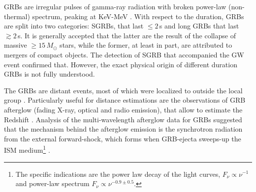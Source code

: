 \acp{GRB} are irregular pulses of gamma-ray radiation with broken power-law 
(non-thermal) spectrum, peaking at KeV-MeV \citep{Band:1993,Kouveliotou:1993,Meegan:1992xg}.
%
With respect to the duration, \acp{GRB} are split into two categories: \acp{SGRB}, 
that last ${\leq}2\,$s and long \acp{GRB} that last ${\gtrsim}2\,$s. 
It is generally accepted that the latter are the 
result of the collapse of massive ${\geq}15\,M_{\odot}$ stars, while the former, at 
least in part, are attributed to mergers of compact objects. 
%
The detection of \ac{SGRB} \GRB{} that accompanied 
the \ac{GW} event \GW{} \citep{TheLIGOScientific:2017qsa} confirmed that. 
However, the exact physical origin of different duration \acp{GRB} is not fully understood.
%

The \acp{GRB} are distant events, most of which were localized to outside the local 
group \citep[\eg][]{Mao:1992,Piran:1992,Fenimore:1993}. 
%
Particularly useful for distance estimations are the observations of \ac{GRB} afterglow
(fading X-ray, optical and radio emission), 
that allow to estimate the Redshift \citep[\eg][]{Costa:1997cg,Frontera:1997ae}.
%
Analysis of the multi-wavelength afterglow data for \acp{GRB} \citep[\eg][]{Panaitescu:2001bx} suggested that the mechanism behind the afterglow 
emission is the synchrotron radiation from the external forward-shock, which forms 
when \ac{GRB}-ejecta sweeps-up the \ac{ISM} medium\footnote{
    The specific indications are the power law decay of the light curves, 
    $F_{\nu}\propto \nu^{-1}$ and power-law spectrum $F_{\nu}\propto\nu^{-0.9\pm 0.5}$.
} 
\citep{Rees:1992ek,Paczynski:1993gz,Meszaros:1993ju,Meszaros:1996sv}.
%

